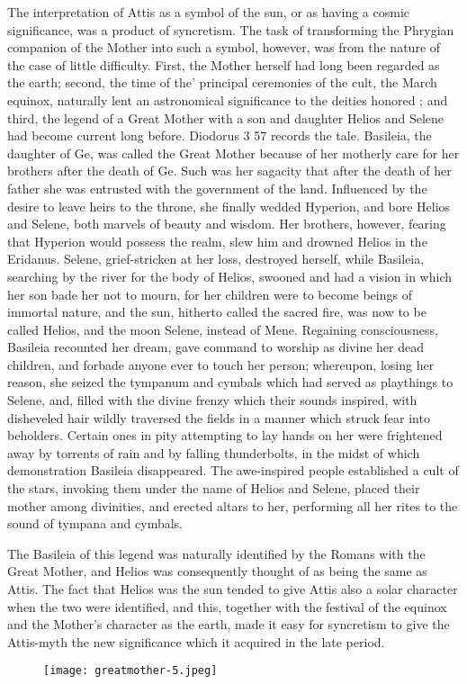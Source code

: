 \documentclass[a4paper, 11pt, oneside, polutonikogreek, english]{article}
\begin{document}
The interpretation of Attis as a symbol of the sun, or as having a cosmic significance, was a product of syncretism. The task of transforming the Phrygian companion of the Mother into such a symbol, however, was from the nature of the case of little difficulty. First, the Mother herself had long been regarded as the earth; second, the time of the' principal ceremonies of the cult, the March equinox, naturally lent an astronomical significance to the deities honored ; and third, the legend of a Great Mother with a son and daughter Helios and Selene had become current long before. Diodorus 3 57 records the tale. Basileia, the daughter of Ge, was called the Great Mother because of her motherly care for her brothers after the death of Ge. Such was her sagacity that after the death of her father she was entrusted with the government of the land. Influenced by the desire to leave heirs to the throne, she finally wedded Hyperion, and bore Helios and Selene, both marvels of beauty and wisdom. Her brothers, however, fearing that Hyperion would possess the realm, slew him and drowned Helios in the Eridanus. Selene, grief-stricken at her loss, destroyed herself, while Basileia, searching by the river for the body of Helios, swooned and had a vision in which her son bade her not to mourn, for her children were to become beings of immortal nature, and the sun, hitherto called the sacred fire, was now to be called Helios, and the moon Selene, instead of Mene. Regaining consciousness, Basileia recounted her dream, gave command to worship as divine her dead children, and forbade anyone ever to touch her person; whereupon, losing her reason, she seized the tympanum and cymbals which had served as playthings to Selene, and, filled with the divine frenzy which their sounds inspired, with disheveled hair wildly traversed the fields in a manner which struck fear into beholders. Certain ones in pity attempting to lay hands on her were frightened away by torrents of rain and by falling thunderbolts, in the midst of which demonstration Basileia disappeared. The awe-inspired people established a cult of the stars, invoking them under the name of Helios and Selene, placed their mother among divinities, and erected altars to her, performing all her rites to the sound of tympana and cymbals.

The Basileia of this legend was naturally identified by the Romans with the Great Mother, and Helios was consequently thought of as being the same as Attis. The fact that Helios was the sun tended to give Attis also a solar character when the two were identified, and this, together with the festival of the equinox and the Mother's character as the earth, made it easy for syncretism to give the Attis-myth the new significance which it acquired in the late period.
\clearpage
\begin{landscape}
\begin{figure}[H]
\centering
\texttt{[image: greatmother-5.jpeg]}
\caption{}
\end{figure}
\end{landscape}
\clearpage
\end{document}

